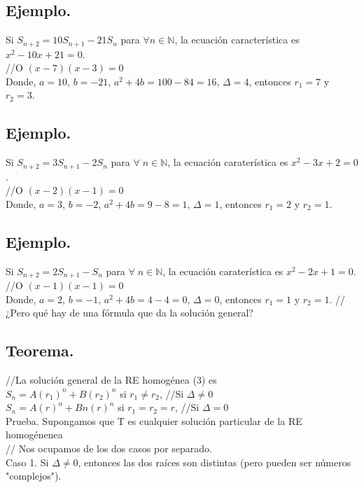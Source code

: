 \documentclass{article}
\begin{document}
\subsection{Ejemplo.}
Si $S_{n+2} = 10S_{n+1} - 21S_n$ para $\forall n \in \mathbb{N}$, la ecuación característica es $x^2 - 10x +21 = 0$.\\
//O $(x-7)(x-3)=0$\\
Donde, $a=10$, $b=-21$, $a^2+4b=100-84=16$, $\Delta = 4$, entonces $r_1 = 7$ y $r_2 = 3$.

\subsection{Ejemplo.}
Si $S_{n+2} = 3S_{n+1}-2S_{n}$ para $\forall \; n \in \mathbb{N}$, la ecuación caraterística es $x^2-3x+2=0$.\\
//O $(x-2)(x-1)=0$\\
Donde, $a=3$, $b=-2$, $a^2+4b=9-8=1$, $\Delta = 1$, entonces $r_1=2$ y $r_2=1$.


\subsection{Ejemplo.}
Si $S_{n+2} = 2S_{n+1}- S_{n}$ para $\forall \; n \in \mathbb{N}$, la ecuación caraterística es $x^2-2x+1=0$.\\
//O $(x-1)(x-1)=0$\\
Donde, $a=2$, $b=-1$, $a^2+4b=4-4=0$, $\Delta = 0$, entonces $r_1=1$ y $r_2=1$.
// ¿Pero qué hay de una fórmula que da la solución general?

\subsection{Teorema.}
//La solución general de la RE homogénea (3) es\\

$S_n = A(r_1)^n + B(r_2)^n$ si $r_1 \neq r_2$, \;\;\;\;\;\;\;\;\;\;\; //Si $\Delta \neq 0$\\
$S_n = A(r)^n + Bn(r)^n$ si $r_1 = r_2 = r$, \;\;\;\;\;\;\;\;\;\;\; //Si $\Delta = 0$\\

Prueba. Supongamos que T es cualquier solución particular de la RE homogénenea\\
// Nos ocupamos de los dos casos por separado.\\

Caso 1. Si $\Delta \neq 0$, entonces las dos raíces son distintas (pero pueden ser números "complejos").\\
\end{document}
